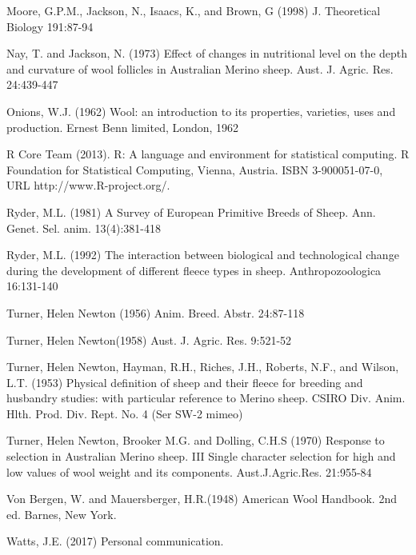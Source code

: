 \documentclass[titlepage]{article}  %
\begin{document}
\begin{thebibliography}{99}
Moore, G.P.M., Jackson, N., Isaacs, K., and Brown, G (1998) J. Theoretical Biology 191:87-94


Nay, T. and Jackson, N. (1973) Effect of changes in nutritional level on the depth and curvature of wool follicles in Australian Merino sheep. Aust. J. Agric. Res. 24:439-447

Onions, W.J. (1962) Wool: an introduction to its properties, varieties, uses
     and production. Ernest Benn limited, London, 1962

R Core Team (2013). R: A language and environment for statistical
  computing. R Foundation for Statistical Computing, Vienna, Austria.
  ISBN 3-900051-07-0, URL http://www.R-project.org/.

Ryder, M.L. (1981) A Survey of European Primitive Breeds of Sheep. Ann. Genet. Sel. anim. 13(4):381-418

Ryder, M.L. (1992) The interaction between biological and technological change during the development of different fleece types in sheep. Anthropozoologica 16:131-140

Turner, Helen Newton (1956) Anim. Breed. Abstr. 24:87-118

Turner, Helen Newton(1958) Aust. J. Agric. Res. 9:521-52

Turner, Helen Newton, Hayman, R.H., Riches, J.H., Roberts, N.F., and Wilson, L.T. (1953) Physical definition of sheep and their fleece for breeding and husbandry studies: with particular reference to Merino sheep. CSIRO Div. Anim. Hlth. Prod. Div. Rept. No. 4 (Ser SW-2 mimeo)


Turner, Helen Newton, Brooker M.G. and Dolling, C.H.S (1970) Response to selection in Australian Merino sheep. III Single character selection for high and low values of wool weight and its components. Aust.J.Agric.Res. 21:955-84

Von Bergen, W. and Mauersberger, H.R.(1948) American Wool Handbook. 2nd ed. Barnes, New York.

Watts, J.E. (2017) Personal communication.
\end{thebibliography}
\end{document}
